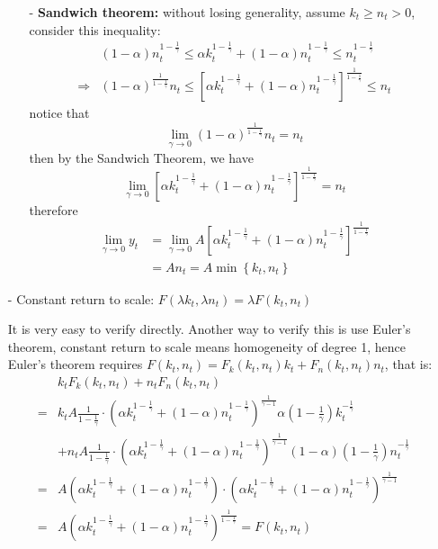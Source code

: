 \documentclass[10pt,landscape,a4paper]{article}
\begin{document}
\begin{multicols*}{3}
\begin{itemize}
\begin{itemize}
        \item[-] \textbf{Sandwich theorem:} without losing generality, assume $k_t\geq n_t>0$, consider this inequality:
        \begin{align*}
            & (1-\alpha)n_t^{1-\frac{1}{\gamma}} \leq \alpha k_t^{1-\frac{1}{\gamma}}+(1-\alpha)n_t^{1-\frac{1}{\gamma}} \leq n_t^{1-\frac{1}{\gamma}}\\
            \Rightarrow & (1-\alpha)^{\frac{1}{1-\frac{1}{\gamma}}}n_t \leq \left[\alpha k_t^{1-\frac{1}{\gamma}}+(1-\alpha)n_t^{1-\frac{1}{\gamma}}\right]^{\frac{1}{1-\frac{1}{\gamma}}} \leq n_t
        \end{align*}
        notice that $$ \lim_{\gamma\rightarrow 0}(1-\alpha)^{\frac{1}{1-\frac{1}{\gamma}}}n_t = n_t$$ then by the Sandwich Theorem, we have
        $$ \lim_{\gamma\rightarrow 0}\left[\alpha k_t^{1-\frac{1}{\gamma}}+(1-\alpha)n_t^{1-\frac{1}{\gamma}}\right]^{\frac{1}{1-\frac{1}{\gamma}}} =n_t$$
        therefore
        \begin{align*}
            \lim_{\gamma\rightarrow 0}y_t &= \lim_{\gamma\rightarrow 0}A\left[\alpha k_t^{1-\frac{1}{\gamma}}+(1-\alpha)n_t^{1-\frac{1}{\gamma}}\right]^{\frac{1}{1-\frac{1}{\gamma}}}\\
            & =A n_t = A\min\left\{k_t,n_t\right\}
        \end{align*}
    \end{itemize}
    
    \item[-] Constant return to scale: $F(\lambda k_t,\lambda n_t)=\lambda F(k_t,n_t)$
    
    It is very easy to verify directly. Another way to verify this is use Euler's theorem, constant return to scale means homogeneity of degree 1, hence Euler's theorem requires $F(k_t,n_t)=F_k(k_t,n_t)k_t+F_n(k_t,n_t)n_t$, that is:
    \begin{align*}
        & k_t F_k(k_t,n_t)+n_t F_n(k_t,n_t) \\
        =& k_t A \frac{1}{1-\frac{1}{\gamma}}\cdot \left(\alpha k_t^{1-\frac{1}{\gamma}}+(1-\alpha)n_t^{1-\frac{1}{\gamma}}\right)^{\frac{1}{\gamma-1}} \alpha\left(1-\frac{1}{\gamma}\right)k_t^{-\frac{1}{\gamma}}\\ &+n_t A \frac{1}{1-\frac{1}{\gamma}}\cdot \left(\alpha k_t^{1-\frac{1}{\gamma}}+(1-\alpha)n_t^{1-\frac{1}{\gamma}}\right)^{\frac{1}{\gamma-1}} (1-\alpha)\left(1-\frac{1}{\gamma}\right)n_t^{-\frac{1}{\gamma}}\\
        =& A\left( \alpha k_t^{1-\frac{1}{\gamma}}+(1-\alpha) n_t^{1-\frac{1}{\gamma}} \right)\cdot\left(\alpha k_t^{1-\frac{1}{\gamma}}+(1-\alpha)n_t^{1-\frac{1}{\gamma}}\right)^{\frac{1}{\gamma-1}}\\
        =& A\left(\alpha k_t^{1-\frac{1}{\gamma}}+(1-\alpha)n_t^{1-\frac{1}{\gamma}}\right)^{\frac{1}{1-\frac{1}{\gamma}}}= F(k_t,n_t)
    \end{align*}
    

\end{itemize}
\end{multicols*}
\end{document}
